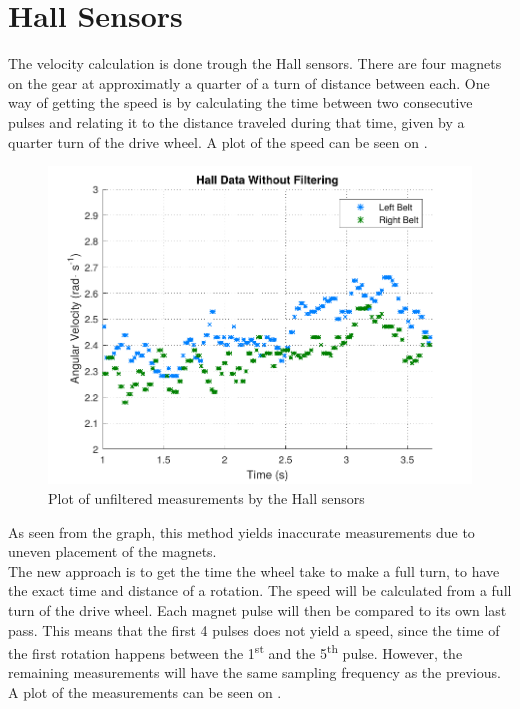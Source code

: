 \section{Hall Sensors}\label{sec:hallFiltering}

The velocity calculation is done trough the Hall sensors. There are four magnets on the gear at approximatly a quarter of a turn of distance between each. One way of getting the speed is by calculating the time between two consecutive pulses and relating it to the distance traveled during that time, given by a quarter turn of the drive wheel. A plot of the speed can be seen on .

\begin{figure}[H]
	\centering
	\includegraphics[scale=0.9]{figures/unfilteredHall.pdf}
	\caption{Plot of unfiltered measurements by the Hall sensors}
	\label{unfilteredHall}
\end{figure}


As seen from the graph, this method yields inaccurate measurements due to uneven placement of the magnets.\\

The new approach is to get the time the wheel take to make a full turn, to have the exact time and distance of a rotation. The speed will be calculated from a full turn of the drive wheel. Each magnet pulse will then be compared to its own last pass. This means that the first 4 pulses does not yield a speed, since the time of the first rotation happens between the \si{1^{st}} and the \si{5^{th}} pulse. However, the remaining measurements will have the same sampling frequency as the previous. A plot of the measurements can be seen on .

